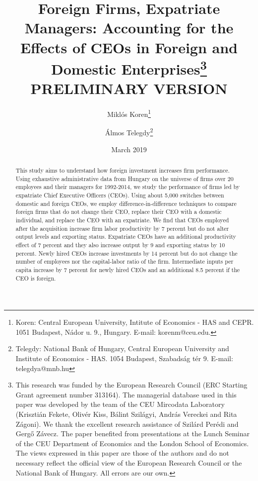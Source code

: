 \documentclass[12pt,a4paper]{article}
\begin{document}
\title{Foreign Firms, Expatriate Managers: Accounting for the Effects of CEOs in Foreign and Domestic Enterprises\thanks{This research was funded by the European Research Council (ERC Starting Grant agreement number 313164). The managerial database used in this paper was developed by the team of the CEU Mircodata Laboratory (Krisztián Fekete, Olivér Kiss, Bálint Szilágyi, András Vereckei and Rita Zágoni). We thank the excellent research assistance of Szilárd Perédi and Gergő Závecz. The paper benefited from presentations at the Lunch Seminar of the CEU Department of Economics and the London School of Economics. The views expressed in this paper are those of the authors and do not necessary reflect the official view of the European Research Council or the National Bank of Hungary. All errors are our own.}\newline\\\small{PRELIMINARY VERSION}}

\author{Miklós Koren\thanks{Koren: Central European University, Intitute of Economics - HAS and CEPR. 1051 Budapest, Nádor u. 9., Hungary. E-mail: korenm@ceu.edu.} \and Álmos Telegdy\thanks{Telegdy: National Bank of Hungary, Central European University and Institute of Economics - HAS. 1054 Budapest, Szabadság tér 9. E-mail: telegdya@mnb.hu}}

\date{March 2019}
\maketitle

\begin{abstract}
This study aims to understand how foreign investment increases firm performance. Using exhaustive administrative data from Hungary on the universe of firms over 20 employees and their managers for 1992-2014, we study the performance of firms led by expatriate Chief Executive Officers (CEOs). Using about 5,000 switches between domestic and foreign CEOs, we employ difference-in-difference techniques to compare foreign firms that do not change their CEO, replace their CEO with a domestic individual, and replace the CEO with an expatriate. We find that CEOs employed after the acquisition increase firm labor productivity by 7 percent but do not alter output levels and exporting status. Expatriate CEOs have an additional productivity effect of 7 percent and they also increase output by 9 and exporting status by 10 percent. Newly hired CEOs increase investments by 14 percent but do not change the number of employees nor the capital-labor ratio of the firm. Intermediate inputs per capita increase by 7 percent for newly hired CEOs and an additional 8.5 percent if the CEO is foreign. 
\end{abstract}
\end{document}
